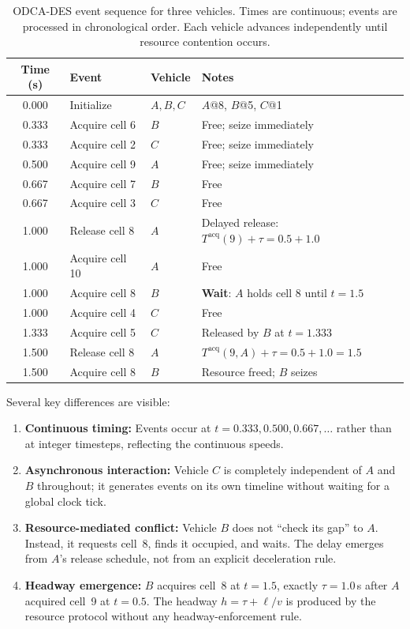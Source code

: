 \documentclass[review,authoryear]{elsarticle}
\newcommand{\Tacq}{T^{\text{acq}}}
\begin{document}
\begin{table}[ht]
\centering
\caption{ODCA-DES event sequence for three vehicles. Times are continuous; events are processed in chronological order. Each vehicle advances independently until resource contention occurs.}
\label{tab:odca_example}
\begin{tabular}{@{}clll@{}}
\toprule
Time (s) & Event & Vehicle & Notes \\
\midrule
0.000 & Initialize & $A,B,C$ & $A$@8, $B$@5, $C$@1 \\
0.333 & Acquire cell 6 & $B$ & Free; seize immediately \\
0.333 & Acquire cell 2 & $C$ & Free; seize immediately \\
0.500 & Acquire cell 9 & $A$ & Free; seize immediately \\
0.667 & Acquire cell 7 & $B$ & Free \\
0.667 & Acquire cell 3 & $C$ & Free \\
1.000 & Release cell 8 & $A$ & Delayed release: $\Tacq(9) + \tau = 0.5 + 1.0$ \\
1.000 & Acquire cell 10 & $A$ & Free \\
1.000 & Acquire cell 8 & $B$ & \textbf{Wait}: $A$ holds cell 8 until $t=1.5$ \\
1.000 & Acquire cell 4 & $C$ & Free \\
1.333 & Acquire cell 5 & $C$ & Released by $B$ at $t = 1.333$ \\
1.500 & Release cell 8 & $A$ & $\Tacq(9,A) + \tau = 0.5 + 1.0 = 1.5$ \\
1.500 & Acquire cell 8 & $B$ & Resource freed; $B$ seizes \\
\bottomrule
\end{tabular}
\end{table}

Several key differences are visible:
\begin{enumerate}
    \item \textbf{Continuous timing:} Events occur at $t = 0.333, 0.500, 0.667, \ldots$ rather than at integer timesteps, reflecting the continuous speeds.
    \item \textbf{Asynchronous interaction:} Vehicle $C$ is completely independent of $A$ and $B$ throughout; it generates events on its own timeline without waiting for a global clock tick.
    \item \textbf{Resource-mediated conflict:} Vehicle $B$ does not ``check its gap'' to $A$. Instead, it requests cell~8, finds it occupied, and waits. The delay emerges from $A$'s release schedule, not from an explicit deceleration rule.
    \item \textbf{Headway emergence:} $B$ acquires cell~8 at $t = 1.5$, exactly $\tau = 1.0$\,s after $A$ acquired cell~9 at $t = 0.5$. The headway $h = \tau + \ell/v$ is produced by the resource protocol without any headway-enforcement rule.
\end{enumerate}
\end{document}
